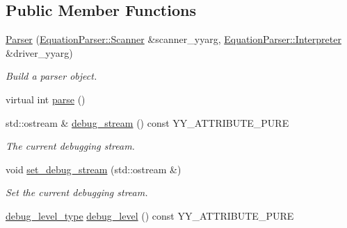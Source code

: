 \subsection*{Public Member Functions}
\begin{DoxyCompactItemize}
\item 
\hyperlink{classEquationParser_1_1Parser_a38d8470f3359dfc8016e41cdd9152976}{Parser} (\hyperlink{classEquationParser_1_1Scanner}{Equation\+Parser\+::\+Scanner} \&scanner\+\_\+yyarg, \hyperlink{classEquationParser_1_1Interpreter}{Equation\+Parser\+::\+Interpreter} \&driver\+\_\+yyarg)\hypertarget{classEquationParser_1_1Parser_a38d8470f3359dfc8016e41cdd9152976}{}\label{classEquationParser_1_1Parser_a38d8470f3359dfc8016e41cdd9152976}

\begin{DoxyCompactList}\small\item\em Build a parser object. \end{DoxyCompactList}\item 
virtual int \hyperlink{classEquationParser_1_1Parser_a9d6040f47e455fd00a5eacccc2082210}{parse} ()
\item 
std\+::ostream \& \hyperlink{classEquationParser_1_1Parser_aa2beb7e7f4fa688b37cf8017f0077735}{debug\+\_\+stream} () const Y\+Y\+\_\+\+A\+T\+T\+R\+I\+B\+U\+T\+E\+\_\+\+P\+U\+RE\hypertarget{classEquationParser_1_1Parser_aa2beb7e7f4fa688b37cf8017f0077735}{}\label{classEquationParser_1_1Parser_aa2beb7e7f4fa688b37cf8017f0077735}

\begin{DoxyCompactList}\small\item\em The current debugging stream. \end{DoxyCompactList}\item 
void \hyperlink{classEquationParser_1_1Parser_aa5ecd3ac4d14a33a0836822e3ad0f08c}{set\+\_\+debug\+\_\+stream} (std\+::ostream \&)\hypertarget{classEquationParser_1_1Parser_aa5ecd3ac4d14a33a0836822e3ad0f08c}{}\label{classEquationParser_1_1Parser_aa5ecd3ac4d14a33a0836822e3ad0f08c}

\begin{DoxyCompactList}\small\item\em Set the current debugging stream. \end{DoxyCompactList}\item 
\hyperlink{classEquationParser_1_1Parser_af424755ada4b3f8e2d6e70ff513242d9}{debug\+\_\+level\+\_\+type} \hyperlink{classEquationParser_1_1Parser_ac1f3c93eda89df9f1d033594494d7608}{debug\+\_\+level} () const Y\+Y\+\_\+\+A\+T\+T\+R\+I\+B\+U\+T\+E\+\_\+\+P\+U\+RE\hypertarget{classEquationParser_1_1Parser_ac1f3c93eda89df9f1d033594494d7608}{}\label{classEquationParser_1_1Parser_ac1f3c93eda89df9f1d033594494d7608}


\end{DoxyCompactItemize}
